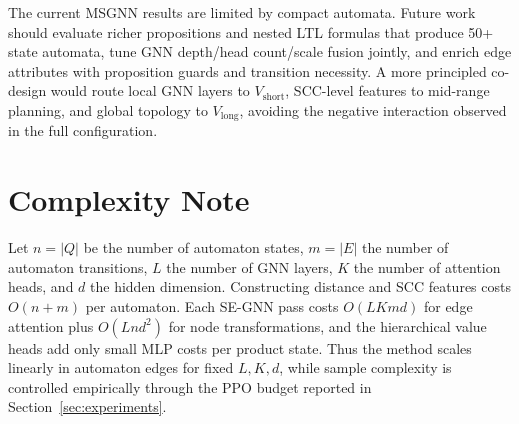 \documentclass[conference]{IEEEtran}
\begin{document}
The current MSGNN results are limited by compact automata. Future work should evaluate richer propositions and nested LTL formulas that produce 50+ state automata, tune GNN depth/head count/scale fusion jointly, and enrich edge attributes with proposition guards and transition necessity. A more principled co-design would route local GNN layers to $V_{\text{short}}$, SCC-level features to mid-range planning, and global topology to $V_{\text{long}}$, avoiding the negative interaction observed in the full configuration.

\section{Complexity Note}
\label{app:complexity}

Let $n=|Q|$ be the number of automaton states, $m=|E|$ the number of automaton transitions, $L$ the number of GNN layers, $K$ the number of attention heads, and $d$ the hidden dimension. Constructing distance and SCC features costs $O(n+m)$ per automaton. Each SE-GNN pass costs $O(LKmd)$ for edge attention plus $O(Lnd^2)$ for node transformations, and the hierarchical value heads add only small MLP costs per product state. Thus the method scales linearly in automaton edges for fixed $L,K,d$, while sample complexity is controlled empirically through the PPO budget reported in Section~\ref{sec:experiments}.

\ifCLASSOPTIONcaptionsoff
  \newpage
\fi



\end{document}
